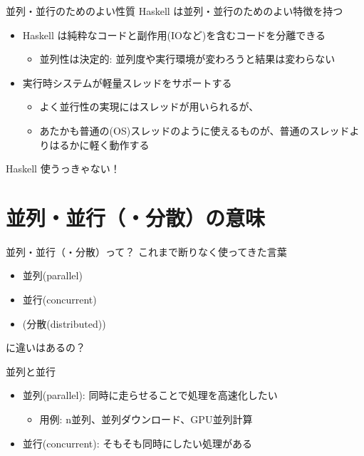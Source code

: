 \documentclass[unicode,12pt]{beamer}
\begin{document}
\begin{frame}{並列・並行のためのよい性質}
  Haskell は並列・並行のためのよい特徴を持つ
  \begin{itemize}
  \item Haskell は純粋なコードと副作用(IOなど)を含むコードを分離できる
    \begin{itemize}
    \item 並列性は\alert{決定的}: 並列度や実行環境が変わろうと結果は変わらない
    \end{itemize}
  \item 実行時システムが\alert{軽量スレッド}をサポートする
    \begin{itemize}
    \item よく並行性の実現にはスレッドが用いられるが、
    \item あたかも普通の(OS)スレッドのように使えるものが、普通のスレッドよりはるかに軽く動作する
    \end{itemize}
  \end{itemize}
  Haskell 使うっきゃない！
\end{frame}

\section{並列・並行（・分散）の意味}

\begin{frame}{並列・並行（・分散）って？}
  これまで断りなく使ってきた言葉
  \begin{itemize}
  \item 並列(parallel)
  \item 並行(concurrent)
  \item (分散(distributed))
  \end{itemize}
  に違いはあるの？
\end{frame}

\begin{frame}{並列と並行}
  \begin{itemize}
  \item 並列(parallel): 同時に走らせることで処理を\alert{高速化}したい
    \begin{itemize}
    \item 用例: n並列、並列ダウンロード、GPU並列計算
    \end{itemize}
  \item 並行(concurrent): \alert{そもそも}同時にしたい処理がある
  \end{itemize}
\end{frame}
\end{document}
